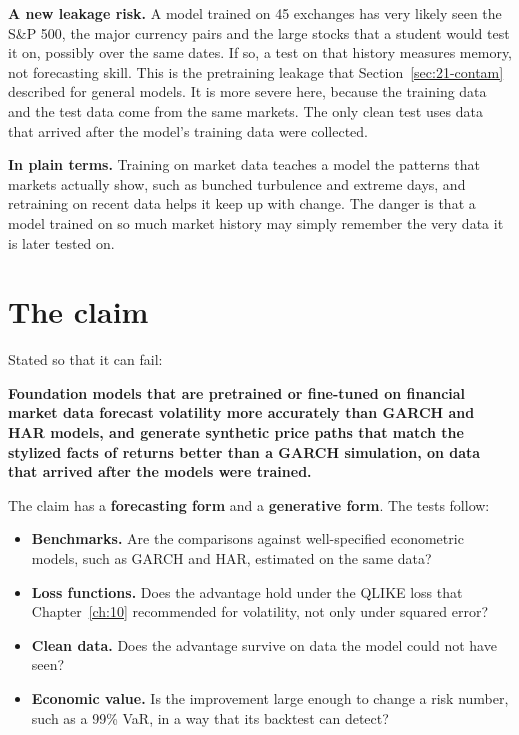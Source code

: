 \textbf{A new leakage risk.} A model trained on 45 exchanges has very likely seen the S\&P 500, the major currency pairs and the large stocks that a student would test it on, possibly over the same dates. If so, a test on that history measures memory, not forecasting skill. This is the pretraining leakage that Section~\ref{sec:21-contam} described for general models. It is more severe here, because the training data and the test data come from the same markets. The only clean test uses data that arrived after the model's training data were collected.

\noindent\textbf{In plain terms.} Training on market data teaches a model the patterns that markets actually show, such as bunched turbulence and extreme days, and retraining on recent data helps it keep up with change. The danger is that a model trained on so much market history may simply remember the very data it is later tested on.

\section{The claim}
\label{sec:23-claim}

Stated so that it can fail:

\begin{callout}
\textbf{Foundation models that are pretrained or fine-tuned on financial market data forecast volatility more accurately than GARCH and HAR models, and generate synthetic price paths that match the stylized facts of returns better than a GARCH simulation, on data that arrived after the models were trained.}
\end{callout}

The claim has a \textbf{forecasting form} and a \textbf{generative form}. The tests follow:

\begin{itemize}
  \item \textbf{Benchmarks.} Are the comparisons against well-specified econometric models, such as GARCH and HAR, estimated on the same data?
  \item \textbf{Loss functions.} Does the advantage hold under the QLIKE loss that Chapter~\ref{ch:10} recommended for volatility, not only under squared error?
  \item \textbf{Clean data.} Does the advantage survive on data the model could not have seen?
  \item \textbf{Economic value.} Is the improvement large enough to change a risk number, such as a 99\% VaR, in a way that its backtest can detect?
\end{itemize}

